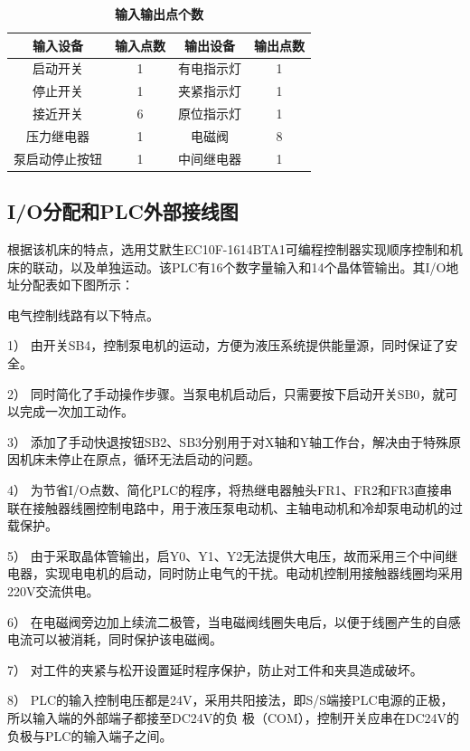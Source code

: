 	
\begin{table}[h]
\centering
\caption{\textbf{输入输出点个数}}
\begin{tabular}{cccc}
	\toprule
	输入设备 & 输入点数 & 输出设备 & 输出点数 \\
	\midrule
	启动开关 & 1 & 有电指示灯 & 1 \\

	停止开关 & 1 & 夹紧指示灯 & 1 \\

	接近开关 & 6 & 原位指示灯 & 1\\

	压力继电器 & 1 & 电磁阀 & 8\\

	泵启动停止按钮 & 1& 中间继电器 & 1\\
	\bottomrule
\end{tabular}
\end{table}



\subsection{I/O分配和PLC外部接线图}
根据该机床的特点，选用艾默生EC10F-1614BTA1可编程控制器实现顺序控制和机床的联动，以及单独运动。该PLC有16个数字量输入和14个晶体管输出。其I/O地址分配表如下图所示：


电气控制线路有以下特点。

1）	由开关SB4，控制泵电机的运动，方便为液压系统提供能量源，同时保证了安全。

2）	同时简化了手动操作步骤。当泵电机启动后，只需要按下启动开关SB0，就可以完成一次加工动作。

3）	添加了手动快退按钮SB2、SB3分别用于对X轴和Y轴工作台，解决由于特殊原因机床未停止在原点，循环无法启动的问题。

4）	为节省I/O点数、简化PLC的程序，将热继电器触头FR1、FR2和FR3直接串联在接触器线圈控制电路中，用于液压泵电动机、主轴电动机和冷却泵电动机的过载保护。

5）	由于采取晶体管输出，启Y0、Y1、Y2无法提供大电压，故而采用三个中间继电器，实现电电机的启动，同时防止电气的干扰。电动机控制用接触器线圈均采用220V交流供电。

6）	在电磁阀旁边加上续流二极管，当电磁阀线圈失电后，以便于线圈产生的自感电流可以被消耗，同时保护该电磁阀。

7）	对工件的夹紧与松开设置延时程序保护，防止对工件和夹具造成破坏。

8） PLC的输入控制电压都是24V，采用共阳接法，即S/S端接PLC电源的正极，所以输入端的外部端子都接至DC24V的负
极（COM），控制开关应串在DC24V的负极与PLC的输入端子之间。

